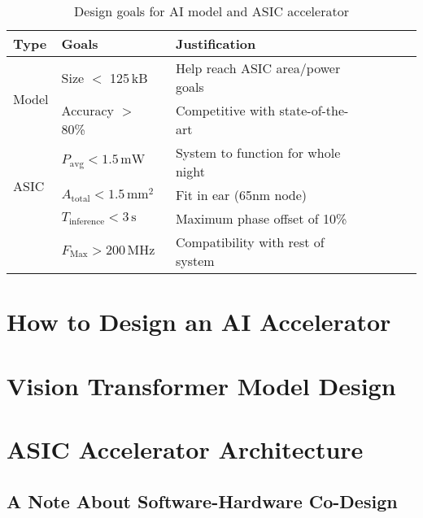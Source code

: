 \documentclass[12pt, hidelinks, draft]{article}
\begin{document}
\begin{table}
    \centering
    \renewcommand{\arraystretch}{1.2} %
    \setlength{\arrayrulewidth}{1.5pt} %
    \caption{Design goals for AI model and ASIC accelerator}
    \begin{tabular}{@{} *7l @{}}
        \toprule
        Type        & Goals                                     & Justification &&&  \\\midrule
        \multirow{2}{*}{Model}
                    & Size $<$ 125\,kB                          & Help reach ASIC area/power goals \\
                    & Accuracy $>$ 80\%                         & Competitive with state-of-the-art \\ \bottomrule
        \multirow{3}{*}{ASIC}
                    & $P_{\mathrm{avg}} < 1.5\,\mathrm{mW}$     & System to function for whole night \\
                    & $A_{\mathrm{total}} < 1.5\,\mathrm{mm}^2$ & Fit in ear (65nm node) \\
                    & $T_{\mathrm{inference}} < 3\,\mathrm{s}$  & Maximum phase offset of 10\% \\
                    & $F_{\mathrm{Max}} > 200\,\mathrm{MHz}$    & Compatibility with rest of system \\
        \hline
    \end{tabular}
    \label{tab:design_goals}
\end{table}

\newpage
\section{How to Design an AI Accelerator}
\label{sec:methods}


\newpage
\section{Vision Transformer Model Design}
\label{sec:vision_transformer}


\section{ASIC Accelerator Architecture}
\label{sec:arch}


\subsection{A Note About Software-Hardware Co-Design}
\lipsum[1]
\end{document}
